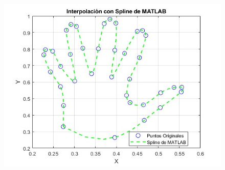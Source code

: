 \begin{homeworkProblem}
\begin{solucion}
\begin{figure}[H]
    \vfill
    \begin{minipage}{0.6\textwidth}
        \centering
        \includegraphics[width=\textwidth]{Figures/interpolacion de matlab.jpg} %
        \label{fig:imagen3}
    \end{minipage}
\end{figure}

  \end{solucion}
\end{homeworkProblem}
